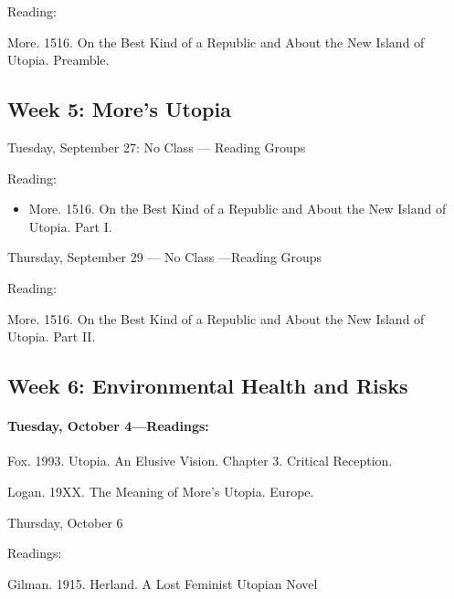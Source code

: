 \noindent Reading:
    \begin{itemize*}
    \item More. 1516. On the Best Kind of a Republic and About the New Island of Utopia. Preamble.
    \end{itemize*}
    
    
    \subsection{\textbf{Week 5}: More's Utopia}
    
Tuesday, September 27: No Class --- Reading Groups

\noindent Reading:
    \begin{itemize}
    \item More. 1516. On the Best Kind of a Republic and About the New Island of Utopia. Part I.
    \end{itemize}
      
Thursday, September 29 --- No Class ---Reading Groups 
 
\noindent Reading:   
    \begin{itemize*}
    \item More. 1516. On the Best Kind of a Republic and About the New Island of Utopia. Part II.
    \end{itemize*}



\subsection{\textbf{Week 6}: Environmental Health and Risks}
      
\paragraph{Tuesday, October 4---Readings:}      
      \begin{itemize*}
      \item Fox. 1993. Utopia. An Elusive Vision. Chapter 3. Critical Reception.
      \item Logan. 19XX. The Meaning of More's Utopia. Europe. 
      \end{itemize*}

Thursday, October 6

Readings: 
      
      \begin{itemize*}
      \item Gilman. 1915. Herland. A Lost Feminist Utopian Novel
      \end{itemize*}
      
